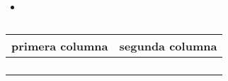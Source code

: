 \documentclass[a4paper,11pt]{article} %
\numberwithin{equation}{section} %
\numberwithin{figure}{section} %
\numberwithin{table}{section} %
\begin{document}
{\bf } %
{\tt } %

\begin{itemize} %
\item{} %

\end{itemize}

\begin{table}[h] %
\begin{center}
\begin{tabular}{|c|c|} %
\hline
primera columna & segunda columna \\ %
\hline
\\
\hline
\\
\hline
\\
\hline
\\ %
\end{tabular}
\end{center}
\caption{}
\label{}
\end{table}
\end{document}
